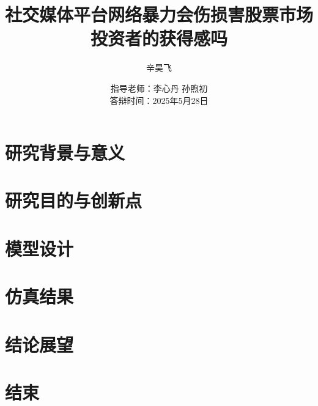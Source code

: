 \documentclass[aspectratio=1610, 10pt, compress]{beamer}
\title[网络暴力与投资者获得感]{社交媒体平台网络暴力会伤损害股票市场投资者的获得感吗}
\subtitle{}
\author[211275016 辛昊飞]{辛昊飞 \quad 211275016}
\institute[南京大学工程管理学院]{南京大学工程管理学院 \\
金融工程（计算机金融工程实验班）}
\date[2025年5月]{指导老师：李心丹  \quad 孙煦初  \\
答辩时间：2025年5月28日}
\begin{document}
    \begin{frame}
        \Background
        \thispagestyle{empty}
        \addtocounter{framenumber}{-1}
        \titlepage        
    \end{frame}



    \section{研究背景与意义}
        
    \section{研究目的与创新点}
        
    \section{模型设计}
        
    \section{仿真结果}
        
    \section{结论展望}
        
    
           
    \section{结束}
        \begin{frame}
            \Background
            \centering
            \Huge {}
        \end{frame}
\end{document}
